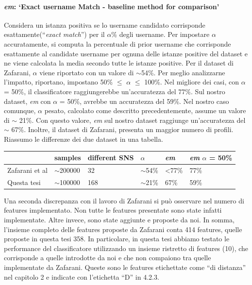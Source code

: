 \paragraph{\textit{em}: ‘Exact username Match - baseline method for comparison’}
Considera un istanza positiva se lo username candidato corrisponde esattamente(“\textit{exact match}”) per il $\alpha$\% degli username. Per impostare $\alpha$ accuratamente, si computa la percentuale di prior username che corrisponde esattamente al candidate username per ognuna delle istanze positive del dataset e ne viene calcolata la media secondo tutte le istanze positive.\newline\newline
Per il dataset di Zafarani, $\alpha$ viene riportato con un valore di $\sim$54\%. Per meglio analizzarne l'impatto, riportano, impostano 50\% $\leq$ $\alpha$ $\leq$ 100\%.
Nel migliore dei casi, con $\alpha$ = 50\%, il classificatore raggiungerebbe un'accuratezza del 77\%.\newline
Sul nostro dataset, \textit{em} con $\alpha$ = 50\%, avrebbe un accuratezza del 59\%.
Nel nostro caso comunque, $\alpha$ pesato, calcolato come descritto precedentemente, assume un valore di $\sim$ 21\%. Con questo valore, \textit{em} sul nostro dataset raggiunge un'accuratezza del $\sim$ 67\%. Inoltre, il dataset di Zafarani, presenta un maggior numero di profili. Riassumo le differenze dei due dataset in una tabella.\newline




\begin{tabular}{ |l|l|l|l|l|l| }
	\hline
	 & \textbf{samples} & \textbf{different SNS} & \textbf{$\alpha$} & \textbf{\textit{em}} & \textbf{\textit{em} $\alpha$ = 50\%} \\ \hline
	Zafarani et al & $\sim$200000  & 32 & $\sim$54\%  & \textless 77\%  & 77\%\\ \hline
	Questa tesi &  $\sim$100000 & 168 & $\sim$21\%  & 67\%  & 59\% \\
	\hline
\end{tabular}
\newline\newline

Una seconda discrepanza con il lavoro di Zafarani si può osservare nel numero di features implementato. Non tutte le features presentate\cite{zafarani13} sono state infatti implementate. Altre invece, sono state aggiunte e proposte da noi. In somma, l'insieme completo delle features proposte da Zafarani conta 414 features, quelle proposte in questa tesi 358. In particolare, in questa tesi abbiamo testato le performance del classificatore utilizzando un insieme ristretto di features (10), che corrisponde a quelle introdotte da noi e che non compaiono tra quelle implementate da Zafarani. Queste sono le features etichettate come “di distanza” nel capitolo 2 e indicate con l'etichetta “D” in 4.2.3.

